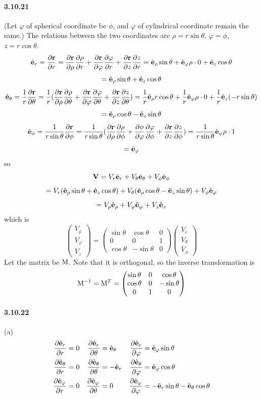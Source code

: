 \documentclass[a4paper]{article}
\begin{document}
\paragraph{3.10.21}
(Let $\varphi$ of spherical coordinate be $\phi$, and $\varphi$ of cylindrical coordinate remain the same.)
The relations between the two coordinates are $\rho=r\sin\theta$, $\varphi=\phi$, $z=r\cos\theta$.
\[
\VE_r=\pdv{\V{r}}{r}=\pdv{\V{r}}{\rho}\pdv{\rho}{r}+\pdv{\V{r}}{\varphi}\pdv{\varphi}{r}+\pdv{\V{r}}{z}\pdv{z}{r}
=\VE_\rho\sin\theta+\VE_\varphi\rho\cdot0+\VE_z\cos\theta
\]
\[
=\VE_\rho\sin\theta+\VE_z\cos\theta
\]
\[
\VE_\theta=\frac{1}{r}\pdv{\V{r}}{\theta}=\frac{1}{r}(\pdv{\V{r}}{\rho}\pdv{\rho}{\theta}+\pdv{\V{r}}{\varphi}\pdv{\varphi}{\theta}+\pdv{\V{r}}{z}\pdv{z}{\theta})=
\frac{1}{r}\VE_\rho r\cos\theta+\frac{1}{r}\VE_\varphi\rho\cdot0+\frac{1}{r}\VE_z(-r\sin\theta)
\]
\[
=\VE_\rho\cos\theta-\VE_z\sin\theta
\]
\[
\VE_\phi=\frac{1}{r\sin\theta}\pdv{\V{r}}{\phi}=\frac{1}{r\sin\theta}(\pdv{\V{r}}{\rho}\pdv{\rho}{\phi}+\pdv{\V{\phi}}{\varphi}\pdv{\varphi}{\phi}+\pdv{\V{r}}{z}\pdv{z}{\phi})=
\frac{1}{r\sin\theta}\VE_\varphi\rho\cdot1
\]
\[
=\VE_\varphi
\]
so
\[
\V{V}=V_r\VE_r+V_\theta\VE_\theta+V_\phi\VE_\phi
\]
\[
=V_r(\VE_\rho\sin\theta+\VE_z\cos\theta)+V_\theta(\VE_\rho\cos\theta-\VE_z\sin\theta)+V_\phi\VE_\varphi
\]
\[
=V_\rho\VE_\rho+V_\varphi\VE_\varphi+V_z\VE_z
\]
which is 
\[
\begin{pmatrix}
V_\rho\\V_\varphi\\V_z
\end{pmatrix}=
\begin{pmatrix}
\sin\theta&\cos\theta&0\\
0&0&1\\
\cos\theta&-\sin\theta&0
\end{pmatrix}
\begin{pmatrix}
V_r\\V_\theta\\V_\phi
\end{pmatrix}
\]
Let the matrix be $\M{M}$. Note that it is orthogonal, so the inverse transformation is 
\[
\M{M}^{-1}=\M{M}^T=
\begin{pmatrix}
\sin\theta&0&\cos\theta\\
\cos\theta&0&-\sin\theta\\
0&1&0
\end{pmatrix}
\]

\paragraph{3.10.22}
(a) 
\begin{align*}
    \pdv{\VE_r}{r}&=0 &
    \pdv{\VE_r}{\theta}&=\VE_\theta&
    \pdv{\VE_r}{\varphi}&=\VE_\varphi\sin\theta\\
    \pdv{\VE_\theta}{r}&=0 &
    \pdv{\VE_\theta}{\theta}&=-\VE_r&
    \pdv{\VE_\theta}{\varphi}&=\VE_\varphi\cos\theta\\
    \pdv{\VE_\varphi}{r}&=0 &
    \pdv{\VE_\varphi}{\theta}&=0&
    \pdv{\VE_\varphi}{\varphi}&=-\VE_r\sin\theta-\VE_\theta\cos\theta \\
\end{align*}
\end{document}
